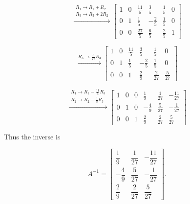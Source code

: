 \documentclass{beamer}
\begin{document}
\begin{frame}
\[
\overset{\substack{R_1 \to R_1 + R_2 \\ R_3 \to R_3 + 2R_2}}{\longrightarrow}
\left[\begin{array}{ccc|ccc}
1 & 0 & \tfrac{11}{5} & \tfrac{3}{5} & \tfrac{1}{5} & 0\\
0 & 1 & \tfrac{1}{5} & -\tfrac{2}{5} & \tfrac{1}{5} & 0\\
0 & 0 & \tfrac{27}{5} & \tfrac{6}{5} & \tfrac{2}{5} & 1
\end{array}\right]
\]

\[
\overset{R_3 \to \tfrac{5}{27}R_3}{\longrightarrow}
\left[\begin{array}{ccc|ccc}
1 & 0 & \tfrac{11}{5} & \tfrac{3}{5} & \tfrac{1}{5} & 0\\
0 & 1 & \tfrac{1}{5} & -\tfrac{2}{5} & \tfrac{1}{5} & 0\\
0 & 0 & 1 & \tfrac{2}{9} & \tfrac{2}{27} & \tfrac{5}{27}
\end{array}\right]
\]
\end{frame}

\begin{frame}
\[
\overset{\substack{R_1 \to R_1 - \tfrac{11}{5}R_3 \\ R_2 \to R_2 - \tfrac{1}{5}R_3}}{\longrightarrow}
\left[\begin{array}{ccc|ccc}
1 & 0 & 0 & \tfrac{1}{9} & \tfrac{1}{27} & -\tfrac{11}{27}\\
0 & 1 & 0 & -\tfrac{4}{9} & \tfrac{5}{27} & -\tfrac{1}{27}\\
0 & 0 & 1 & \tfrac{2}{9} & \tfrac{2}{27} & \tfrac{5}{27}
\end{array}\right]
\]

Thus the inverse is

\[
A^{-1} =
\begin{bmatrix}
\dfrac{1}{9} & \dfrac{1}{27} & -\dfrac{11}{27}\\[6pt]
-\dfrac{4}{9} & \dfrac{5}{27} & -\dfrac{1}{27}\\[6pt]
\dfrac{2}{9} & \dfrac{2}{27} & \dfrac{5}{27}
\end{bmatrix}.
\]
\end{frame}
\end{document}
